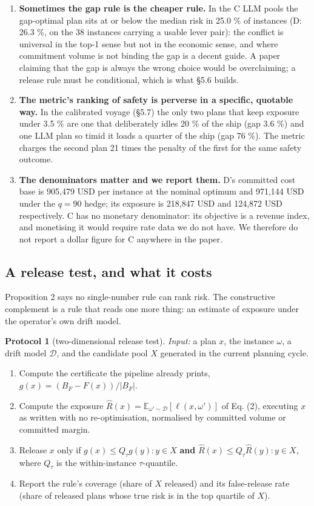 \documentclass[preprint,12pt,letterpaper]{elsarticle}
\theoremstyle{definition}
\newtheorem{protocol}{Protocol}
\theoremstyle{plain}
\begin{document}
\begin{enumerate}
\item \textbf{Sometimes the gap rule is the cheaper rule.} In the C LLM pools the gap-optimal plan sits at or below the median risk in 25.0 \% of instances (D: 26.3 \%, on the 38 instances carrying a usable lever pair): the conflict is universal in the top-1 sense but not in the economic sense, and where commitment volume is not binding the gap is a decent guide. A paper claiming that the gap is always the wrong choice would be overclaiming; a release rule must be conditional, which is what \S 5.6 builds.
\item \textbf{The metric's ranking of safety is perverse in a specific, quotable way.} In the calibrated voyage (\S 5.7) the only two plans that keep exposure under 3.5 \% are one that deliberately idles 20 \% of the ship (gap 3.6 \%) and one LLM plan so timid it loads a quarter of the ship (gap 76 \%). The metric charges the second plan 21 times the penalty of the first for the same safety outcome.
\item \textbf{The denominators matter and we report them.} D's committed cost base is 905,479 USD per instance at the nominal optimum and 971,144 USD under the $q = 90$ hedge; its exposure is 218,847 USD and 124,872 USD respectively. C has no monetary denominator: its objective is a revenue index, and monetising it would require rate data we do not have. We therefore do not report a dollar figure for C anywhere in the paper.
\end{enumerate}

\subsection{A release test, and what it costs}

Proposition 2 says no single-number rule can rank risk. The constructive complement is a rule that reads one more thing: an estimate of exposure under the operator's own drift model.

\begin{protocol}[two-dimensional release test]
\textit{Input:} a plan $x$, the instance $\omega$, a drift model $\mathcal{D}$, and the candidate pool $X$ generated in the current planning cycle.

\begin{enumerate}
\item Compute the certificate the pipeline already prints, $g(x) = (B_{F} - F(x))/|B_{F}|$.
\item Compute the exposure $\hat{R}(x) = \mathbb{E}_{\omega'\sim \mathcal{D}}[ \ell(x, \omega') ]$ of Eq. (2), executing $x$ as written with no re-optimisation, normalised by committed volume or committed margin.
\item Release $x$ only if $g(x) \le Q_\tau{g(y) : y \in X}$ \textbf{and} $\hat{R}(x) \le Q_\tau{\hat{R}(y) : y \in X}$, where $Q_\tau$ is the within-instance $\tau$-quantile.
\item Report the rule's coverage (share of $X$ released) and its false-release rate (share of released plans whose true risk is in the top quartile of $X$).
\end{enumerate}
\end{protocol}
\end{document}

